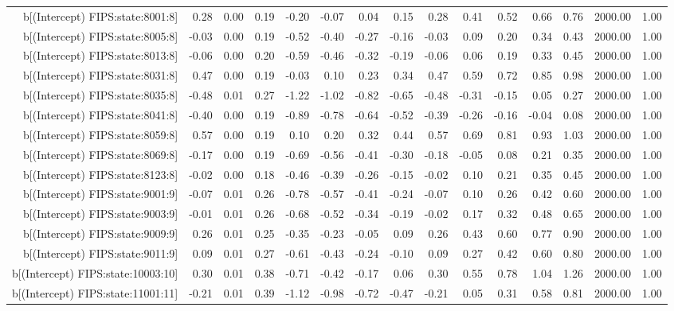 \begin{table}[ht]
\begin{tabular}{rrrrrrrrrrrrrrr}
  b[(Intercept) FIPS:state:8001:8] & 0.28 & 0.00 & 0.19 & -0.20 & -0.07 & 0.04 & 0.15 & 0.28 & 0.41 & 0.52 & 0.66 & 0.76 & 2000.00 & 1.00 \\ 
  b[(Intercept) FIPS:state:8005:8] & -0.03 & 0.00 & 0.19 & -0.52 & -0.40 & -0.27 & -0.16 & -0.03 & 0.09 & 0.20 & 0.34 & 0.43 & 2000.00 & 1.00 \\ 
  b[(Intercept) FIPS:state:8013:8] & -0.06 & 0.00 & 0.20 & -0.59 & -0.46 & -0.32 & -0.19 & -0.06 & 0.06 & 0.19 & 0.33 & 0.45 & 2000.00 & 1.00 \\ 
  b[(Intercept) FIPS:state:8031:8] & 0.47 & 0.00 & 0.19 & -0.03 & 0.10 & 0.23 & 0.34 & 0.47 & 0.59 & 0.72 & 0.85 & 0.98 & 2000.00 & 1.00 \\ 
  b[(Intercept) FIPS:state:8035:8] & -0.48 & 0.01 & 0.27 & -1.22 & -1.02 & -0.82 & -0.65 & -0.48 & -0.31 & -0.15 & 0.05 & 0.27 & 2000.00 & 1.00 \\ 
  b[(Intercept) FIPS:state:8041:8] & -0.40 & 0.00 & 0.19 & -0.89 & -0.78 & -0.64 & -0.52 & -0.39 & -0.26 & -0.16 & -0.04 & 0.08 & 2000.00 & 1.00 \\ 
  b[(Intercept) FIPS:state:8059:8] & 0.57 & 0.00 & 0.19 & 0.10 & 0.20 & 0.32 & 0.44 & 0.57 & 0.69 & 0.81 & 0.93 & 1.03 & 2000.00 & 1.00 \\ 
  b[(Intercept) FIPS:state:8069:8] & -0.17 & 0.00 & 0.19 & -0.69 & -0.56 & -0.41 & -0.30 & -0.18 & -0.05 & 0.08 & 0.21 & 0.35 & 2000.00 & 1.00 \\ 
  b[(Intercept) FIPS:state:8123:8] & -0.02 & 0.00 & 0.18 & -0.46 & -0.39 & -0.26 & -0.15 & -0.02 & 0.10 & 0.21 & 0.35 & 0.45 & 2000.00 & 1.00 \\ 
  b[(Intercept) FIPS:state:9001:9] & -0.07 & 0.01 & 0.26 & -0.78 & -0.57 & -0.41 & -0.24 & -0.07 & 0.10 & 0.26 & 0.42 & 0.60 & 2000.00 & 1.00 \\ 
  b[(Intercept) FIPS:state:9003:9] & -0.01 & 0.01 & 0.26 & -0.68 & -0.52 & -0.34 & -0.19 & -0.02 & 0.17 & 0.32 & 0.48 & 0.65 & 2000.00 & 1.00 \\ 
  b[(Intercept) FIPS:state:9009:9] & 0.26 & 0.01 & 0.25 & -0.35 & -0.23 & -0.05 & 0.09 & 0.26 & 0.43 & 0.60 & 0.77 & 0.90 & 2000.00 & 1.00 \\ 
  b[(Intercept) FIPS:state:9011:9] & 0.09 & 0.01 & 0.27 & -0.61 & -0.43 & -0.24 & -0.10 & 0.09 & 0.27 & 0.42 & 0.60 & 0.80 & 2000.00 & 1.00 \\ 
  b[(Intercept) FIPS:state:10003:10] & 0.30 & 0.01 & 0.38 & -0.71 & -0.42 & -0.17 & 0.06 & 0.30 & 0.55 & 0.78 & 1.04 & 1.26 & 2000.00 & 1.00 \\ 
  b[(Intercept) FIPS:state:11001:11] & -0.21 & 0.01 & 0.39 & -1.12 & -0.98 & -0.72 & -0.47 & -0.21 & 0.05 & 0.31 & 0.58 & 0.81 & 2000.00 & 1.00 \\ 

\end{tabular}
\end{table}
